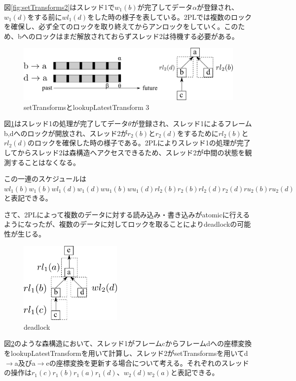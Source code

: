 \documentclass[a4paper]{jreport}	%
\begin{document}
図\ref{fig:setTransforms2}はスレッド1で$w_1(b)$が完了してデータ$\alpha$が登録され、$w_1(d)$をする前に$wl_1(d)$をした時の様子を表している。2PLでは複数のロックを確保し、必ず全てのロックを取り終えてからアンロックをしていく。このため、bへのロックはまだ解放されておらずスレッド2は待機する必要がある。


\begin{figure}[h] 
\centering
\includegraphics[width=12cm]{setTransforms3}
\caption{setTransformsとlookupLatestTransform 3}
\label{fig:setTransforms3}
\end{figure}


図\ref{fig:setTransforms3}はスレッド1の処理が完了してデータ$\theta$が登録され、スレッド1によるフレームb,dへのロックが開放され、スレッド2が$r_2(b)$と$r_2(d)$をするために$rl_2(b)$と$rl_2(d)$のロックを確保した時の様子である。2PLによりスレッド1の処理が完了してからスレッド2は森構造へアクセスできるため、スレッド2が中間の状態を観測することはなくなる。

この一連のスケジュールは$wl_1(b)w_1(b)wl_1(d)w_1(d)wu_1(b)wu_1(d)rl_2(b)r_2(b)rl_2(d)r_2(d)ru_2(b)ru_2(d)$と表記できる。

さて、2PLによって複数のデータに対する読み込み・書き込みがatomicに行えるようになったが、複数のデータに対してロックを取ることによりdeadlockの可能性が生じる。


\begin{figure}[h] 
\centering
\includegraphics[width=5cm]{deadlock}
\caption{deadlock}
\label{fig:deadlock}
\end{figure}

図\ref{fig:deadlock}のような森構造において、スレッド1がフレームcからフレームdへの座標変換をlookupLatestTransformを用いて計算し、スレッド2がsetTransformsを用いてd$\rightarrow$a及びa$\rightarrow$eの座標変換を更新する場合について考える。それぞれのスレッドの操作は$r_1(c)r_1(b)r_1(a)r_1(d)$、$w_2(d)w_2(a)$と表記できる。
\end{document}
